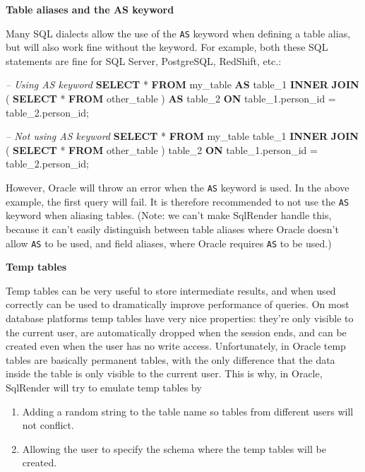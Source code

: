 \documentclass[11pt]{book}
\newenvironment{Shaded}{\begin{snugshade}}{\end{snugshade}}
\newcommand{\KeywordTok}[1]{\textcolor[rgb]{0.13,0.29,0.53}{\textbf{#1}}}
\newcommand{\DecValTok}[1]{\textcolor[rgb]{0.00,0.00,0.81}{#1}}
\newcommand{\CommentTok}[1]{\textcolor[rgb]{0.56,0.35,0.01}{\textit{#1}}}
\newcommand{\NormalTok}[1]{#1}
\providecommand{\tightlist}{%
  \setlength{\itemsep}{0pt}\setlength{\parskip}{0pt}}
\begin{document}
\textbf{Table aliases and the AS keyword}

Many SQL dialects allow the use of the \texttt{AS} keyword when defining
a table alias, but will also work fine without the keyword. For example,
both these SQL statements are fine for SQL Server, PostgreSQL, RedShift,
etc.:

\begin{Shaded}
\begin{Highlighting}[]
\CommentTok{-- Using AS keyword}
\KeywordTok{SELECT}\NormalTok{ * }
\KeywordTok{FROM}\NormalTok{ my_table }\KeywordTok{AS}\NormalTok{ table_}\DecValTok{1}
\KeywordTok{INNER} \KeywordTok{JOIN}\NormalTok{ (}
  \KeywordTok{SELECT}\NormalTok{ * }\KeywordTok{FROM}\NormalTok{ other_table}
\NormalTok{) }\KeywordTok{AS}\NormalTok{ table_}\DecValTok{2}
\KeywordTok{ON}\NormalTok{ table_1.person_id = table_2.person_id;}

\CommentTok{-- Not using AS keyword}
\KeywordTok{SELECT}\NormalTok{ * }
\KeywordTok{FROM}\NormalTok{ my_table table_}\DecValTok{1}
\KeywordTok{INNER} \KeywordTok{JOIN}\NormalTok{ (}
  \KeywordTok{SELECT}\NormalTok{ * }\KeywordTok{FROM}\NormalTok{ other_table}
\NormalTok{) table_}\DecValTok{2}
\KeywordTok{ON}\NormalTok{ table_1.person_id = table_2.person_id;}
\end{Highlighting}
\end{Shaded}

However, Oracle will throw an error when the \texttt{AS} keyword is
used. In the above example, the first query will fail. It is therefore
recommended to not use the \texttt{AS} keyword when aliasing tables.
(Note: we can't make SqlRender handle this, because it can't easily
distinguish between table aliases where Oracle doesn't allow \texttt{AS}
to be used, and field aliases, where Oracle requires \texttt{AS} to be
used.)

\textbf{Temp tables}

Temp tables can be very useful to store intermediate results, and when
used correctly can be used to dramatically improve performance of
queries. On most database platforms temp tables have very nice
properties: they're only visible to the current user, are automatically
dropped when the session ends, and can be created even when the user has
no write access. Unfortunately, in Oracle temp tables are basically
permanent tables, with the only difference that the data inside the
table is only visible to the current user. This is why, in Oracle,
SqlRender will try to emulate temp tables by

\begin{enumerate}
\def\labelenumi{\arabic{enumi}.}
\tightlist
\item
  Adding a random string to the table name so tables from different
  users will not conflict.
\item
  Allowing the user to specify the schema where the temp tables will be
  created.
\end{enumerate}
\end{document}
